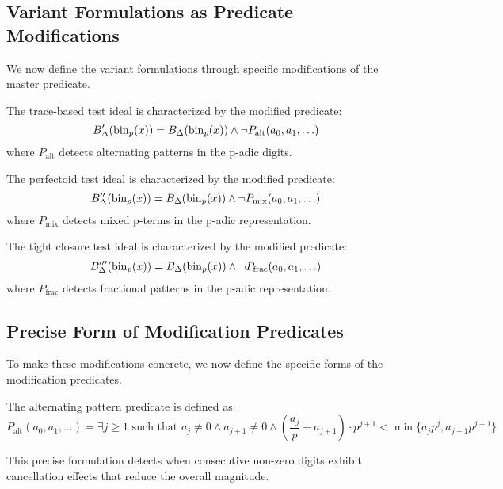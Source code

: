 \subsection{Variant Formulations as Predicate Modifications}

We now define the variant formulations through specific modifications of the master predicate.

\begin{definition}\label{def:trace-based-predicate}
The trace-based test ideal is characterized by the modified predicate:
$$B'_\Delta(\operatorname{bin}_p(x)) = B_\Delta(\operatorname{bin}_p(x)) \wedge \neg P_{\text{alt}}(a_0, a_1, \ldots)$$
where $P_{\text{alt}}$ detects alternating patterns in the p-adic digits.
\end{definition}

\begin{definition}\label{def:perfectoid-predicate}
The perfectoid test ideal is characterized by the modified predicate:
$$B''_\Delta(\operatorname{bin}_p(x)) = B_\Delta(\operatorname{bin}_p(x)) \wedge \neg P_{\text{mix}}(a_0, a_1, \ldots)$$
where $P_{\text{mix}}$ detects mixed p-terms in the p-adic representation.
\end{definition}

\begin{definition}\label{def:tight-closure-predicate}
The tight closure test ideal is characterized by the modified predicate:
$$B'''_\Delta(\operatorname{bin}_p(x)) = B_\Delta(\operatorname{bin}_p(x)) \wedge \neg P_{\text{frac}}(a_0, a_1, \ldots)$$
where $P_{\text{frac}}$ detects fractional patterns in the p-adic representation.
\end{definition}

\subsection{Precise Form of Modification Predicates}

To make these modifications concrete, we now define the specific forms of the modification predicates.

\begin{definition}\label{def:alternating-pattern}
The alternating pattern predicate is defined as:
$$P_{\text{alt}}(a_0, a_1, \ldots) = \exists j \geq 1 \text{ such that } a_j \neq 0 \wedge a_{j+1} \neq 0 \wedge \left(\frac{a_j}{p} + a_{j+1}\right) \cdot p^{j+1} < \min\{a_j p^j, a_{j+1} p^{j+1}\}$$

This precise formulation detects when consecutive non-zero digits exhibit cancellation effects that reduce the overall magnitude.
\end{definition}

